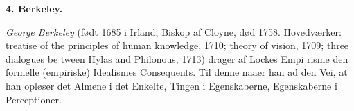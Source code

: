 \documentclass[12pt,a4paper]{book}
\begin{document}
\begin{center}
  \textbf{4. Berkeley.}
\end{center}


\emph{George Berkeley} (født 1685 i Irland, Biskop af Cloyne,
død 1758. Hovedværker: treatise of the principles of human
knowledge, 1710; theory of vision, 1709; three dialogues be\-%
tween Hylas and Philonous, 1713) drager af Lockes Empi\-%
risme den formelle (empiriske) Idealismes Consequents. Til
denne naaer han ad den Vei, at han opløser det Almene i det
Enkelte, Tingen i Egenskaberne, Egenskaberne i Perceptioner.
\end{document}
